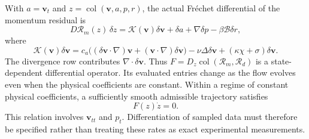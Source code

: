 \documentclass[10pt]{article}
\begin{document}
With $a=\bm v_t$ and $z=\operatorname{col}(\bm v,a,p,r)$, the actual
Fr\'echet differential of the momentum residual is
\begin{equation}
 D\mathcal R_m(z)\,\delta z
 =\mathcal K(\bm v)\delta\bm v+\delta a+
 \nabla\delta p-\beta\mathcal B\delta r,
 \label{eq:afc_frechet}
\end{equation}
where
\begin{equation}
\mathcal K(\bm v)\delta\bm v
 =c_a\bigl((\delta\bm v\cdot\nabla)\bm v+
  (\bm v\cdot\nabla)\delta\bm v\bigr)
  -\nu\Delta\delta\bm v+
  (\kappa\chi+\sigma)\delta\bm v.
\end{equation}
The divergence row contributes $\nabla\cdot\delta\bm v$.
Thus $F=D_z\operatorname{col}(\mathcal R_m,\mathcal R_d)$ is a
state-dependent differential operator. Its evaluated entries change as
the flow evolves even when the physical coefficients are constant.
Within a regime of constant physical coefficients, a sufficiently smooth
admissible trajectory satisfies
\begin{equation}
 F(z)\dot z=0.
 \label{eq:afc_compatibility}
\end{equation}
This relation involves $\bm v_{tt}$ and $p_t$. Differentiation of sampled
data must therefore be specified rather than treating these rates as exact
experimental measurements.
\end{document}
